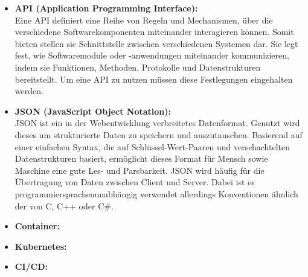 \begin{itemize}
    \item \textbf{API (Application Programming Interface):} \\
    Eine API definiert eine Reihe von Regeln und Mechanismen, über die verschiedene Softwarekomponenten miteinander interagieren können.
    Somit bieten stellen sie Schnittstelle zwischen verschiedenen Systemen dar.
    Sie legt fest, wie Softwaremodule oder -anwendungen miteinander kommunizieren, indem sie Funktionen, Methoden, Protokolle und Datenstrukturen bereitstellt.
    Um eine API zu nutzen müssen diese Festlegungen eingehalten werden.
    
    
    \item \textbf{JSON (JavaScript Object Notation):} \\
    JSON ist ein in der Webentwicklung verbreitetes Datenformat.
    Genutzt wird dieses um strukturierte Daten zu speichern und auszutauschen.
    Basierend auf einer einfachen Syntax, die auf Schlüssel-Wert-Paaren und verschachtelten Datenstrukturen basiert, ermöglicht dieses Format für Mensch sowie Maschine eine gute Les- und Parsbarkeit.
    JSON wird häufig für die Übertragung von Daten zwischen Client und Server.
    Dabei ist es programmiersprachenunabhängig verwendet allerdings Konventionen ähnlich der von C, C++ oder C\#.

    \item \textbf{Container:} \\
    \item \textbf{Kubernetes:} \\
    \item \textbf{CI/CD:} \\
\end{itemize}